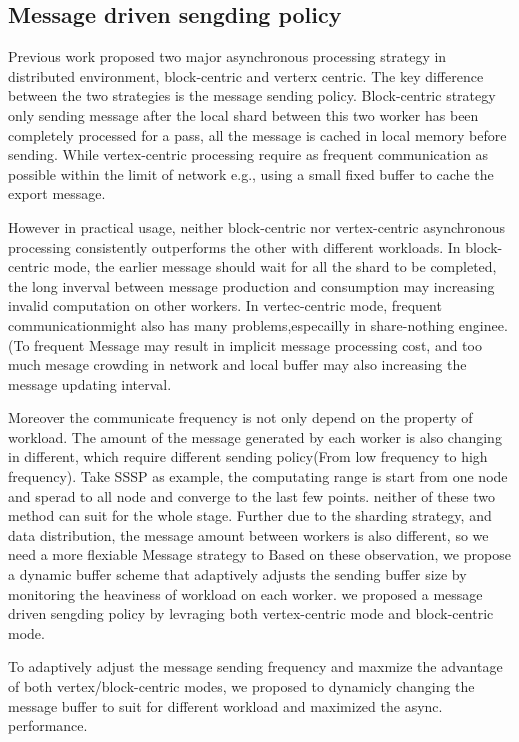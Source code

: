 {\color{red}
\subsection{Message driven sengding policy}

Previous work proposed two major asynchronous processing strategy in distributed environment, block-centric and verterx centric. The key difference between the two strategies is the message sending policy. Block-centric strategy only sending message after the local shard between this two worker has been completely processed for a pass, all the message is cached in local memory before sending. While vertex-centric processing require as frequent communication as possible within the limit of network e.g., using a small fixed buffer to cache the export message.

However in practical usage, neither block-centric nor vertex-centric asynchronous processing consistently outperforms the other with different workloads. In block-centric mode, the earlier message should wait for all the shard to be completed, the long inverval between message production and consumption may increasing invalid computation on other workers. In vertec-centric mode, frequent communicationmight also has many problems,especailly in share-nothing enginee. (To frequent Message may result in implicit message processing cost, and too much mesage crowding in network and local buffer may also increasing the message updating interval. 
  
Moreover the communicate frequency is not only depend on the property of workload. The amount of the message generated by each worker is also changing in different, which require different sending policy(From low frequency to high frequency). Take SSSP as example, the computating range is start from one node and sperad to all node and converge to the last few points. neither of these two method can suit for the whole stage.
Further due to the sharding strategy, and data distribution,  the message amount between workers is also different, so we need a more flexiable Message strategy to  
Based on these observation, we propose a dynamic buffer scheme that adaptively adjusts the
sending buffer size by monitoring the heaviness of workload on each worker. we proposed a message driven sengding policy by levraging both vertex-centric mode and block-centric mode. 

To adaptively adjust the message sending frequency and maxmize the advantage of both vertex/block-centric modes, we proposed to dynamicly changing the message buffer to suit for different workload and maximized the async. performance.

}
